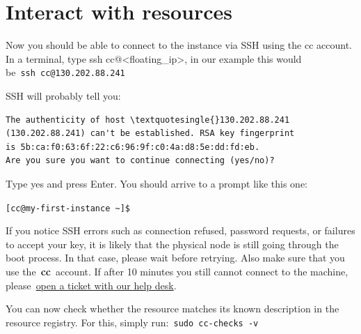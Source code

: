 \section{Interact with resources}\label{interact-with-resources}

Now you should be able to connect to the instance via SSH using the cc
account. In a terminal, type ssh
cc@\textless{}floating\_ip\textgreater{}, in our example this would
be~\texttt{ssh\ cc@130.202.88.241}

SSH will probably tell you:

\begin{verbatim}
The authenticity of host \textquotesingle{}130.202.88.241
(130.202.88.241) can't be established. RSA key fingerprint 
is 5b:ca:f0:63:6f:22:c6:96:9f:c0:4a:d8:5e:dd:fd:eb. 
Are you sure you want to continue connecting (yes/no)?

\end{verbatim}

Type yes and press Enter. You should arrive to a prompt like this one:

\texttt{{[}cc@my-first-instance\ \textasciitilde{}{]}\$}

If you notice SSH errors such as connection refused, password requests,
or failures to accept your key, it is likely that the physical node is
still going through the boot process. In that case, please wait before
retrying. Also make sure that you use the~\textbf{cc}~account. If after
10 minutes you still cannot connect to the machine,
please~\href{https://www.chameleoncloud.org/user/help/}{open a ticket
with our help desk}.

You can now check whether the resource matches its known description in
the resource registry. For this, simply
run:~\texttt{sudo\ cc-checks\ -v}

